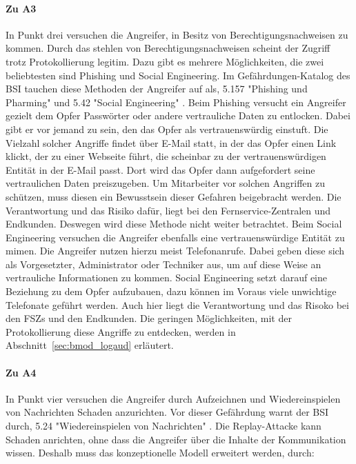 \documentclass[11pt,a4paper]{report}
\begin{document}
\paragraph{Zu A3} In Punkt drei versuchen die Angreifer, in Besitz von Berechtigungsnachweisen zu kommen. Durch das stehlen von Berechtigungsnachweisen scheint der Zugriff trotz Protokollierung legitim. Dazu gibt es mehrere Möglichkeiten, die zwei beliebtesten sind Phishing und Social Engineering. Im Gefährdungen-Katalog des BSI tauchen diese Methoden der Angreifer auf als, 5.157 "Phishing und Pharming" und 5.42 "Social Engineering" \cite{bsi_g5157, bsi_g5042}. Beim Phishing versucht ein Angreifer gezielt dem Opfer Passwörter oder andere vertrauliche Daten zu entlocken. Dabei gibt er vor jemand zu sein, den das Opfer als vertrauenswürdig einstuft. Die Vielzahl solcher Angriffe findet über E-Mail statt, in der das Opfer einen Link klickt, der zu einer Webseite führt, die scheinbar zu der vertrauenswürdigen Entität in der E-Mail passt. Dort wird das Opfer dann aufgefordert seine vertraulichen Daten preiszugeben. Um Mitarbeiter vor solchen Angriffen zu schützen, muss diesen ein Bewusstsein dieser Gefahren beigebracht werden. Die Verantwortung und das Risiko dafür, liegt bei den Fernservice-Zentralen und Endkunden. Deswegen wird diese Methode nicht weiter betrachtet. Beim Social Engineering versuchen die Angreifer ebenfalls eine vertrauenswürdige Entität zu mimen. Die Angreifer nutzen hierzu meist Telefonanrufe. Dabei geben diese sich als Vorgesetzter, Administrator oder Techniker aus, um auf diese Weise an vertrauliche Informationen zu kommen. Social Engineering setzt darauf eine Beziehung zu dem Opfer aufzubauen, dazu können im Voraus viele unwichtige Telefonate geführt werden. Auch hier liegt die Verantwortung und das Risoko bei den FSZs und den Endkunden. Die geringen Möglichkeiten, mit der Protokollierung diese Angriffe zu entdecken, werden in Abschnitt~\ref{sec:bmod_logaud} erläutert.

\paragraph{Zu A4} In Punkt vier versuchen die Angreifer durch Aufzeichnen und Wiedereinspielen von Nachrichten Schaden anzurichten. Vor dieser Gefährdung warnt der BSI durch, 5.24 "Wiedereinspielen von Nachrichten" \cite{bsi_g5024}. Die Replay-Attacke kann Schaden anrichten, ohne dass die Angreifer über die Inhalte der Kommunikation wissen. Deshalb muss das konzeptionelle Modell erweitert werden, durch:
\end{document}
